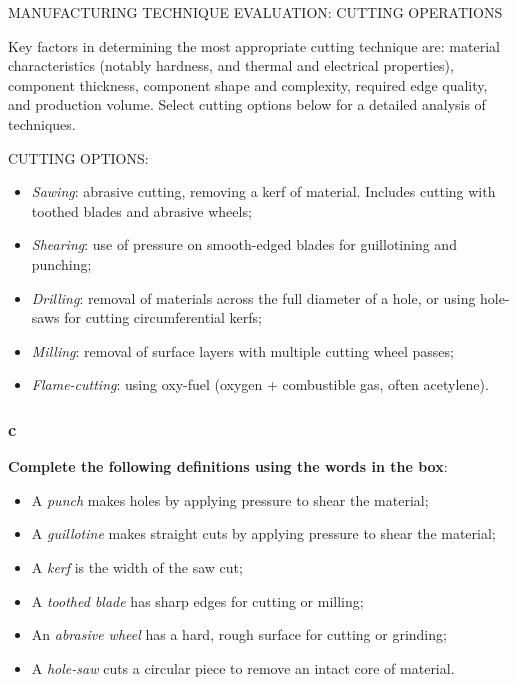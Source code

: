 MANUFACTURING TECHNIQUE EVALUATION: CUTTING OPERATIONS 

Key factors in determining the most appropriate cutting technique are: material characteristics (notably hardness, and thermal and electrical properties), component thickness, component shape and complexity, required edge quality, and production volume. Select cutting options below for a detailed analysis of techniques.

CUTTING OPTIONS:

\begin{itemize}

\item\textit{Sawing}: abrasive cutting, removing a kerf of material. Includes cutting with toothed blades and abrasive wheels;
\item\textit{Shearing}: use of pressure on smooth-edged blades for guillotining and punching;
\item\textit{Drilling}: removal of materials across the full diameter of a hole, or using hole-saws for cutting circumferential kerfs;
\item\textit{Milling}: removal of surface layers with multiple cutting wheel passes;
\item\textit{Flame-cutting}: using oxy-fuel (oxygen + combustible gas, often acetylene).

\end{itemize}

\subsubsection{c}

\textbf{Complete the following definitions using the words in the box}:

\begin{itemize}

\item A \textit{punch} makes holes by applying pressure to shear the material;
\item A \textit{guillotine} makes straight cuts by applying pressure to shear the material;
\item A \textit{kerf} is the width of the saw cut;
\item A \textit{toothed blade} has sharp edges for cutting or milling;
\item An \textit{abrasive wheel} has a hard, rough surface for cutting or grinding;
\item A \textit{hole-saw} cuts a circular piece to remove an intact core of material.

\end{itemize}


